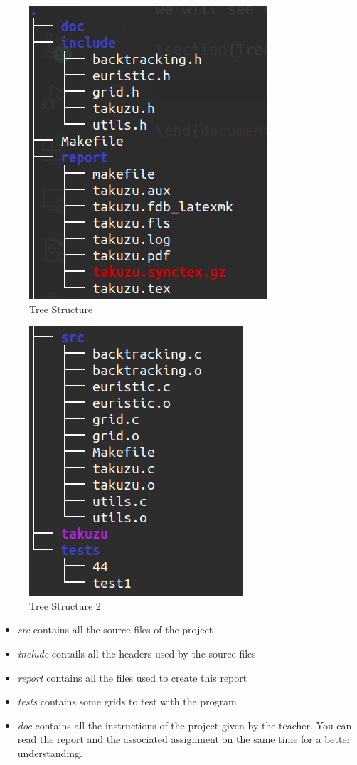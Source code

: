 \documentclass[a4paper,12pt]{article}
\begin{document}
    
    \begin{figure}
        \centering
        \includegraphics[scale=0.75]{img/tree1.png}
        \caption{Tree Structure}
    \end{figure}
    \begin{figure}
        \centering
        \includegraphics[scale=0.75]{img/tree2.png}
        \caption{Tree Structure 2}
    \end{figure}

    \begin{itemize}
        \item \textit{src} contains all the source files of the project
        \item \textit{include} contails all the headers used by the source files 
        \item \textit{report} contains all the files used to create this report
        \item \textit{tests} contains some grids to test with the program
        \item \textit{doc} contains all the instructions of the project given by the teacher.
        You can read the report and the associated assignment on the same time for a better understanding.
    \end{itemize} 
\end{document}

